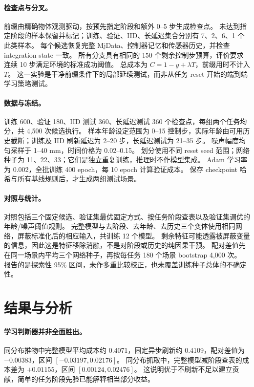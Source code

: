 \documentclass{article}
\begin{document}
\paragraph{检查点与分叉。}
前缀由精确物体观测驱动，按预先指定阶段和额外 0--5 步生成检查点。
未达到指定阶段的样本保留并标记；训练、验证、IID、长延迟集合分别有 7、2、6、1 个此类样本。
每个候选恢复完整 MjData、控制器记忆和传感器历史，并检查 integration state 一致。
所有分支具有相同的 150 个剩余控制步预算，评价要求连续 10 步满足环境的标准成功阈值。
总成本为 $C=1-y+\lambda T$，前缀用时不计入 $T$。
这一实验是干净前缀条件下的局部延续测试，而非从任务 reset 开始的端到端学习策略测试。

\paragraph{数据与冻结。}
训练 600、验证 180、IID 测试 360、长延迟测试 360 个检查点，每组两个任务均分，共 4,500 次候选执行。
样本年龄设定范围为 0--15 控制步，实际年龄由可用历史截断；训练及 IID 刷新延迟为 2--20 步，长延迟测试为 21--35 步。
噪声幅度均匀采样于 1--40 mm，时间价格为 0.02--0.15。
划分使用不同 reset seed 范围；网络种子为 11、22、33；它们是独立重复训练，推理时不作模型集成。
Adam 学习率为 0.002，全批训练 400 epoch，每 10 epoch 计算验证成本。
保存 checkpoint 哈希与所有基线规则后，才生成两组测试场景。

\paragraph{对照与统计。}
对照包括三个固定候选、验证集最优固定方式、按任务阶段查表以及验证集调优的年龄/噪声阈值规则。
完整模型与去阶段、去年龄、去历史三个变体使用相同网络，屏蔽标准化后的相应输入，共训练 12 个模型。
剩余特征可能透露被屏蔽变量的信息，因此这是特征移除消融，不是对阶段或历史的纯因果干预。
配对差值先在同一场景内平均三个网络种子，再按每任务 180 个场景 bootstrap 4,000 次。
报告的是探索性 95\% 区间，未作多重比较校正，也未覆盖训练种子总体的不确定性。

\section{结果与分析}

\paragraph{学习判断器并非全面胜出。}
同分布推物中完整模型平均成本约 0.4071，固定异步刷新约 0.4109，配对差值为 $-0.00383$，区间 $[-0.03197,0.02176]$。
同分布抓取中，完整模型减阶段查表的成本差为 $+0.01155$，区间 $[0.00124,0.02476]$。
这说明优于不刷新不足以建立贡献，简单的任务阶段先验已能解释相当部分收益。
\end{document}
